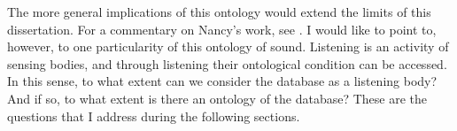 The more general implications of this ontology would extend the limits of this dissertation. For a commentary on Nancy's work, see \textcite{Gra15:The}. I would like to point to, however, to one particularity of this ontology of sound. Listening is an activity of sensing bodies, and through listening their ontological condition can be accessed. In this sense, to what extent can we consider the database as a listening body? And if so, to what extent is there an ontology of the database? These are the questions that I address during the following sections.

